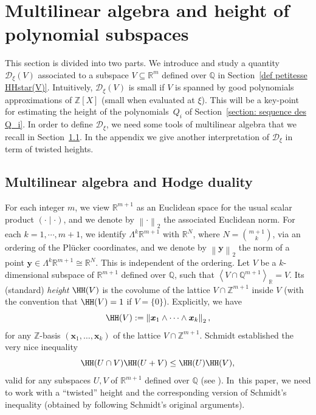 \documentclass[JEP,XML,SOM,Unicode,NoFloatCountersInSection,published]{cedram}
\newcommand\sbw[2]{{{\mathsf{\Lambda}}^{{\!\scriptstyle#1}}{#2}}}
\newcommand\bx{\boldsymbol{x}}
\newcommand\by{\boldsymbol{y}}
\newcommand\bQ{\mathbb{Q}}
\newcommand\bR{\mathbb{R}}
\newcommand\bZ{\mathbb{Z}}
\newcommand\HHstar{\mathcal{D}_{\xi}}
\newcommand{\norm}[1]{\left\|#1 \right\|_2}
\newcommand{\psc}[2]{\left(#1 \mid #2\right)}
\newcommand{\Vect}[2][]{\left\la #2\right\ra_{#1}}
\let\subset \subseteq
\let\la\langle
\let\ra\rangle
\theoremstyle{definition}
\theoremstyle{plain}
\begin{document}
\section{Multilinear algebra and height of polynomial subspaces}

This section is divided into two parts. We introduce and study a quantity $\HHstar(V)$ associated to a subspace $V\subset\bR^m$ defined over $\bQ$ in Section~\ref{def petitesse HHstar(V)}. Intuitively, $\HHstar(V)$ is small if $V$ is spanned by good polynomials approximations of $\bZ[X]$ (\ie small when evaluated at $\xi$). This will be a key-point for estimating the height of the polynomials~$Q_i$ of Section~\ref{section: sequence des Q_i}. In order to define $\HHstar$, we need some tools of multilinear algebra that we recall in Section~\ref{section: hauteurs tordues}. In the appendix we give another interpretation of $\HHstar$ in term of twisted heights.

\subsection{Multilinear algebra and Hodge duality}
\label{section: hauteurs tordues}

For each integer $m$, we view $\bR^{m+1}$ as an Euclidean space for the usual scalar product $\psc{\cdot}{\cdot}$, and we denote by $\norm{\cdot}$ the associated Euclidean norm. For each $k = 1, \cdots , m+1$, we identify $\sbw{k}{\bR^{m+1}}$ with $\bR^N$, where $N = \binom{m+1}{k}$, via an ordering of the Plücker coordinates, and we denote by $\norm{\by}$ the norm of a point $\by \in \sbw{k}{\bR^{m+1}}\cong \bR^N$. This is independent of the ordering. Let $V$ be a $k$-dimensional subspace of $\bR^{m+1}$ defined over $\bQ$, \ie such that $\Vect[\bR]{V\cap\bQ^{m+1}} = V$. Its (standard) \emph{height} $\HH(V)$ is the covolume of the lattice $V\cap\bZ^{m+1}$ inside $V$ (with the convention that $\HH(V) = 1$ if $V=\{0\}$). Explicitly, we have
\[
\HH(V) := \norm{ \bx_1\wedge \cdots \wedge \bx_k},
\]
for any $\bZ$-basis $(\bx_1,\dots,\bx_k)$ of the lattice $V\cap \bZ^{m+1}$. Schmidt established the very nice inequality
\begin{equation*}
\HH(U\cap V)\HH(U+V) \leq \HH(U)\HH(V),
\end{equation*}
valid for any subspaces $U,V$ of $\bR^{m+1}$ defined over $\bQ$ (see \cite[Ch.\,I, Lem.\,8A]{Schmidt}). In~this paper, we need to work with a ``twisted'' height and the corresponding version of Schmidt's inequality (obtained by following Schmidt's original arguments).
\end{document}
